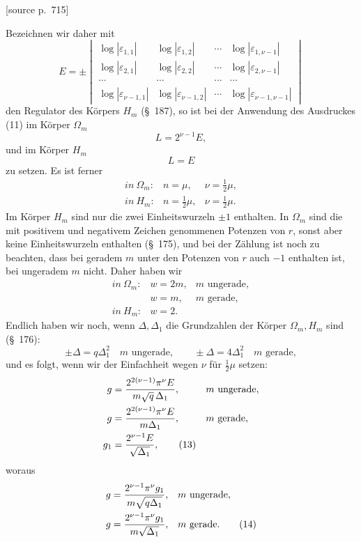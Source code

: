 \documentclass[11pt]{article}
\newcommand{\eps}{\varepsilon}
\newcommand{\srcpage}[1]{\par\medskip\noindent\textsf{[source p.~#1]}\par\smallskip}
\begin{document}
\srcpage{715}
Bezeichnen wir daher mit
\begin{equation}
E=\pm\begin{vmatrix}
\log|\eps_{1,1}|&\log|\eps_{1,2}|&\cdots&\log|\eps_{1,\nu-1}|\\
\log|\eps_{2,1}|&\log|\eps_{2,2}|&\cdots&\log|\eps_{2,\nu-1}|\\
\cdots&\cdots&\cdots&\cdots\\
\log|\eps_{\nu-1,1}|&\log|\eps_{\nu-1,2}|&\cdots&\log|\eps_{\nu-1,\nu-1}|
\end{vmatrix}
\tag{12}
\end{equation}
den Regulator des Körpers $H_m$ (\S~187), so ist bei der Anwendung des Ausdruckes (11) im Körper $\Omega_m$
\[
L=2^{\nu-1}E,
\]
und im Körper $H_m$
\[
L=E
\]
zu setzen. Es ist ferner
\[
\begin{array}{lll}
in\ \Omega_m: & n=\mu, & \nu=\frac12\mu,\\
in\ H_m: & n=\frac12\mu, & \nu=\frac12\mu.
\end{array}
\]
Im Körper $H_m$ sind nur die zwei Einheitswurzeln $\pm1$ enthalten. In $\Omega_m$ sind die mit positivem und negativem Zeichen genommenen Potenzen von $r$, sonst aber keine Einheitswurzeln enthalten (\S~175), und bei der Zählung ist noch zu beachten, dass bei geradem $m$ unter den Potenzen von $r$ auch $-1$ enthalten ist, bei ungeradem $m$ nicht. Daher haben wir
\[
\begin{array}{lll}
in\ \Omega_m: & w=2m, & m\text{ ungerade},\\
& w=m, & m\text{ gerade},\\
in\ H_m: & w=2.&
\end{array}
\]
Endlich haben wir noch, wenn $\Delta,\Delta_1$ die Grundzahlen der Körper $\Omega_m,H_m$ sind (\S~176):
\[
\pm\Delta=q\Delta_1^2\quad m\text{ ungerade},
\qquad
\pm\Delta=4\Delta_1^2\quad m\text{ gerade},
\]
und es folgt, wenn wir der Einfachheit wegen $\nu$ für $\frac12\mu$ setzen:
\begin{align}
g&=\frac{2^{2(\nu-1)}\pi^\nu E}{m\sqrt q\,\Delta_1}, &&m\text{ ungerade},\notag\\
g&=\frac{2^{2(\nu-1)}\pi^\nu E}{m\Delta_1}, &&m\text{ gerade},\notag\\
g_1&=\frac{2^{\nu-1}E}{\sqrt{\Delta_1}},\tag{13}
\end{align}
woraus
\begin{align}
g&=\frac{2^{\nu-1}\pi^\nu g_1}{m\sqrt{q\Delta_1}}, &&m\text{ ungerade},\notag\\
g&=\frac{2^{\nu-1}\pi^\nu g_1}{m\sqrt{\Delta_1}}, &&m\text{ gerade}.\tag{14}
\end{align}
\end{document}
